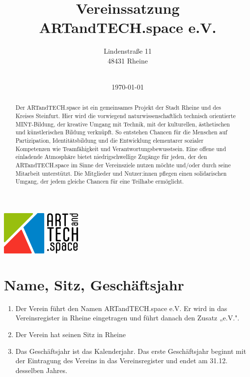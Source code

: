 \documentclass[12pt]{article}
\title{Vereinssatzung \\
ARTandTECH.space e.V.}
\author{
	Lindenstraße 11 \\
	48431 Rheine \\
    \
	}
\date{\today}
\begin{document}
\maketitle
\thispagestyle{empty}

\begin{center}
	\includegraphics[width=0.3\textwidth]{assets/logo.png}
\end{center}


\thispagestyle{fancy}

\begin{abstract}
	Der ARTandTECH.space ist ein gemeinsames Projekt der Stadt Rheine und des Kreises Steinfurt.
	Hier wird die vorwiegend naturwissenschaftlich technisch orientierte MINT-Bildung, der kreative
	Umgang mit Technik, mit der kulturellen, ästhetischen und künstlerischen Bildung verknüpft. So
	entstehen Chancen für die Menschen auf Partizipation, Identitätsbildung und die Entwicklung
	elementarer sozialer Kompetenzen wie Teamfähigkeit und Verantwortungsbewusstsein.
	Eine offene und einladende Atmosphäre bietet niedrigschwellige Zugänge für jeden, der den
	ARTandTECH.space im Sinne der Vereinsziele nutzen möchte und/oder durch seine Mitarbeit
	unterstützt. Die Mitglieder und Nutzer:innen pflegen einen solidarischen Umgang, der jedem gleiche
	Chancen für eine Teilhabe ermöglicht.
\end{abstract}
\newpage

\pagestyle{fancy}
\fancyhf{}
\tableofcontents
\thispagestyle{fancy}
\newpage

\setcounter{page}{1}

\section{Name, Sitz, Geschäftsjahr}
\begin{enumerate}[label=(\arabic*)]
	\item Der Verein führt den Namen ARTandTECH.space e.V. Er wird in das Vereinsregister in Rheine eingetragen und führt danach den Zusatz „e.V.".
	\item Der Verein hat seinen Sitz in Rheine
	\item Das Geschäftsjahr ist das Kalenderjahr. Das erste Geschäftsjahr beginnt mit der Eintragung des Vereins in das Vereinsregister und endet am 31.12. desselben Jahres.
\end{enumerate}
\end{document}
